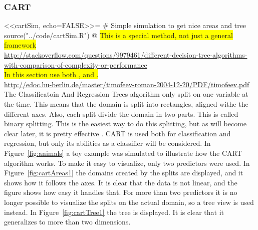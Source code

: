 \subsubsection{CART}
\label{subsub:CART}
<<cartSim, echo=FALSE>>=
# Simple simulation to get nice areas and tree
source("../code/cartSim.R")
@
\colorbox{yellow}{This is a special method, not just a general framework}\\
\url{http://stackoverflow.com/questions/9979461/different-decision-tree-algorithms-with-comparison-of-complexity-or-performance}\\
\colorbox{yellow}{In this section use both \cite{bishop} , \cite{modstat} and \cite{breiman}.}\\
\url{http://edoc.hu-berlin.de/master/timofeev-roman-2004-12-20/PDF/timofeev.pdf}\\
%
The Classificatoin And Regression Trees algorithm only split on one variable at the time. This means that the domain is split into rectangles, aligned withe the different axes. 
Also, each split divide the domain in two parts. This is called binary splitting. This is the easiest way to do this splitting, but as will become clear later, it is pretty effective . CART is used both for classification and regression, but only its abilities as a classifier will be considered.
In Figure~\ref{fig:animals} a toy example was simulated to illustrate how the CART algorithm works. To make it easy to visualize, only two predictors were used. In Figure~\ref{fig:cartAreas1} the domains created by the splits are displayed, and it shows how it follows the axes. It is clear that the data is not linear, and the figure shows how easy it handles that.
For more than two predictors it is no longer possible to visualize the splits on the actual domain, so a tree view is used instead.
 In Figure~\ref{fig:cartTree1} the tree is displayed. It is clear that it generalizes to more than two dimensions. \\
%
